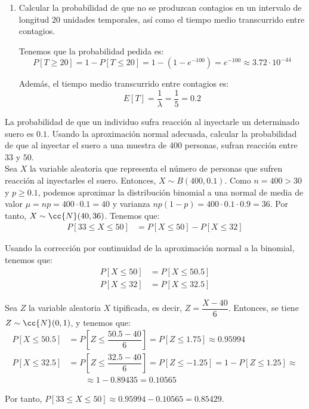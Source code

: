 \begin{ejercicio}
\begin{enumerate}
        \item Calcular la probabilidad de que no se produzcan contagios en un intervalo de longitud $20$ unidades temporales, así como
        el tiempo medio transcurrido entre contagios.

        Tenemos que la probabilidad pedida es: $$P[T\geq 20] = 1-P[T\leq 20] = 1-(1-e^{-100}) = e^{-100} \approx 3.72\cdot 10^{-44}$$

        Además, el tiempo medio transcurrido entre contagios es:
        \begin{equation*}
            E[T] = \dfrac{1}{\lambda} = \dfrac{1}{5} = 0.2
        \end{equation*}


    \end{enumerate}
\end{ejercicio}

\begin{ejercicio}
    La probabilidad de que un individuo sufra reacción al inyectarle un determinado suero es $0.1$. Usando la aproximación normal adecuada, calcular la probabilidad de que al inyectar el suero a una muestra de $400$ personas, sufran reacción entre $33$ y $50$.\\

    Sea $X$ la variable aleatoria que representa el número de personas que sufren reacción al inyectarles el suero. Entonces, $X\sim B(400,0.1)$.
    Como $n=400>30$ y $p\geq 0.1$, podemos aproximar la distribución binomial a una normal de media de valor $\mu = np = 400\cdot 0.1 = 40$ y varianza $np(1-p) = 400\cdot 0.1\cdot 0.9 = 36$. Por tanto, $X\sim \cc{N}(40,36)$.
    Tenemos que:
    \begin{align*}
        P[33\leq X\leq 50] &= P\left[X\leq 50\right] - P\left[X\leq 32\right]
    \end{align*}

    Usando la corrección por continuidad de la aproximación normal a la binomial, tenemos que:
    \begin{align*}
        P\left[X\leq 50\right] &= P\left[X\leq 50.5\right] \\
        P\left[X\leq 32\right] &= P\left[X\leq 32.5\right]
    \end{align*}

    Sea $Z$ la variable aleatoria $X$ tipificada, es decir, $Z = \dfrac{X-40}{6}$. Entonces, se tiene $Z\sim \cc{N}(0,1)$, y tenemos que:
    \begin{align*}
        P\left[X\leq 50.5\right] &= P\left[Z\leq \dfrac{50.5-40}{6}\right] = P\left[Z\leq 1.75\right] \approx 0.95994\\
        P\left[X\leq 32.5\right] &= P\left[Z\leq \dfrac{32.5-40}{6}\right] = P\left[Z\leq -1.25\right]
        = 1-P\left[Z\leq 1.25\right] \approx \\&\qquad \approx 1-0.89435 = 0.10565
    \end{align*}

    Por tanto, $P[33\leq X\leq 50] \approx 0.95994-0.10565 = 0.85429$.
\end{ejercicio}

